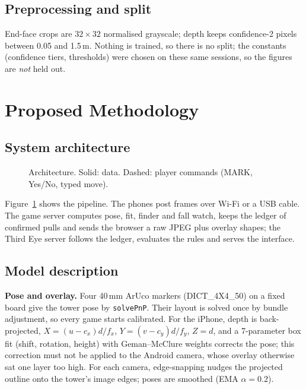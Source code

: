 \documentclass[12pt,a4paper]{article}
\newcommand{\code}[1]{\texttt{\small #1}}
\begin{document}
\subsection{Preprocessing and split}
End-face crops are $32\times32$ normalised grayscale; depth keeps confidence-2 pixels between 0.05 and 1.5\,m. Nothing is trained, so there is no split; the constants (confidence tiers, thresholds) were chosen on these same sessions, so the figures are \emph{not} held out.

\section{Proposed Methodology}
\subsection{System architecture}
\begin{figure}[h]
\centering\small
{}
\caption{Architecture. Solid: data. Dashed: player commands (MARK, Yes/No, typed move).}\label{fig:arch}
\end{figure}
Figure~\ref{fig:arch} shows the pipeline. The phones post frames over Wi-Fi or a USB cable. The game server computes pose, fit, finder and fall watch, keeps the ledger of confirmed pulls and sends the browser a raw JPEG plus overlay shapes; the Third Eye server follows the ledger, evaluates the rules and serves the interface.
\subsection{Model description}
\textbf{Pose and overlay.} Four 40\,mm ArUco markers (DICT\_4X4\_50) on a fixed board give the tower pose by \code{solvePnP}. Their layout is solved once by bundle adjustment, so every game starts calibrated. For the iPhone, depth is back-projected, $X=(u-c_x)d/f_x$, $Y=(v-c_y)d/f_y$, $Z=d$, and a 7-parameter box fit (shift, rotation, height) with Geman--McClure weights corrects the pose; this correction must not be applied to the Android camera, whose overlay otherwise sat one layer too high. For each camera, edge-snapping nudges the projected outline onto the tower's image edges; poses are smoothed (EMA $\alpha=0.2$).
\end{document}
